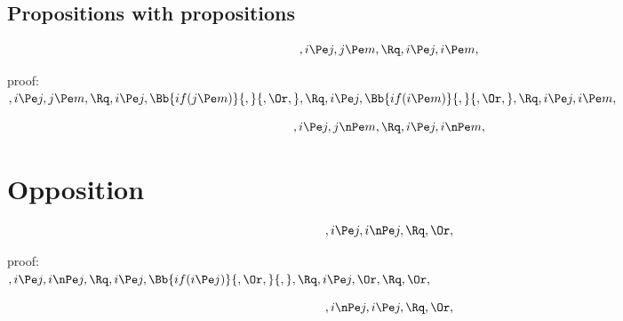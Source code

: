 \bigskip
\bigskip
\bigskip
\bigskip
\subsection{Propositions with propositions}
\[,i \Pe j, j \Pe m, \Rq , i \Pe j, i \Pe m,\]

\bigskip
\bigskip
\bigskip
\bigskip
proof:\\
\begin{math} 
,i \Pe j, j \Pe m,\\\\\\
\Rq, i \Pe j, \Bb{if(j \Pe m)}{,}{, \Or,}, \\\\\\
\Rq, i \Pe j, \Bb{if(i \Pe m)}{,}{, \Or,},  \\\\\\
\Rq, i \Pe j, i \Pe m,
\end{math}

\[,i \Pe j, j \nPe m, \Rq , i \Pe j, i \nPe m,\]




\bigskip
\bigskip
\bigskip
\bigskip
\section{ Opposition}
\[,i \Pe j, i \nPe j, \Rq , \Or,\]


\bigskip
\bigskip
\bigskip
\bigskip
proof:\\
\begin{math} 
,i \Pe j, i \nPe j,\\\\\\
\Rq, i \Pe j,\Bb{if(i \Pe j)}{, \Or ,}{,}, \\\\
\Rq, i \Pe j, \Or, \\\\
\Rq , \Or,
\end{math}



\[,i \nPe j, i \Pe j, \Rq , \Or,\]


